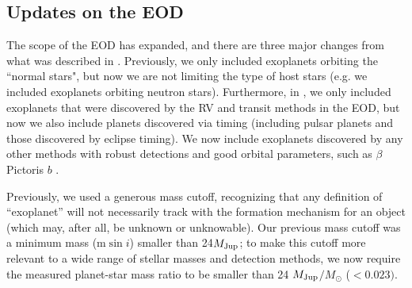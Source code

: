 \documentclass[11pt,preprint]{aastex}
\def\msun{M_{\odot}}
\def\mjup{$M_{\rm Jup}$}
\begin{document}
\begin{CJK*}{UTF8}{gbsn}

\section{Updates on the EOD}\label{sec:update}

The scope of the EOD has expanded, and there are three major changes
from what was described in \cite{Wright2011}. Previously, we only
included exoplanets orbiting the ``normal stars", but now we are not
limiting the type of host stars (e.g. we included exoplanets orbiting
neutron stars). Furthermore, in \cite{Wright2011}, we only included
exoplanets that were discovered by the RV and transit methods in the
EOD, but now we also include planets discovered via timing (including
pulsar planets and those discovered by eclipse timing). We now include
exoplanets discovered by any other methods with robust detections and
good orbital parameters, such as $\beta$ Pictoris $b$ \citep{Chauvin2012,Nielsen2014,Macintosh2014}. 

Previously, we used a generous mass cutoff, recognizing that any
definition of ``exoplanet'' will not necessarily track with the
formation mechanism for an object (which may, after all, be unknown or
unknowable).  Our previous mass cutoff was a minimum mass (m$\sin{i}$)
smaller than 24\mjup; to make this cutoff more relevant to a wide
range of stellar masses and detection methods, we now require the measured
planet-star mass ratio to be smaller than 24 \mjup$/\msun$ ($< 0.023)$.


\end{CJK*}
\end{document}
